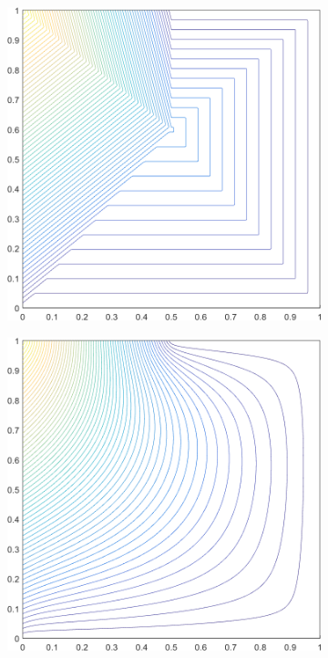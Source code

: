 \begin{figure}
\begin{subfigure}[b]{0.39\textwidth}
		\includegraphics[width=\textwidth]{figures/sec_BF/deg_square_PWLD1_contour_b5.png}
		\caption{}
	\end{subfigure}
	\vfill
	\begin{subfigure}[b]{0.39\textwidth}
		\centering
		\includegraphics[width=\textwidth]{figures/sec_BF/deg_square_MV1_contour_b5.png}

\end{subfigure}
\end{figure}
